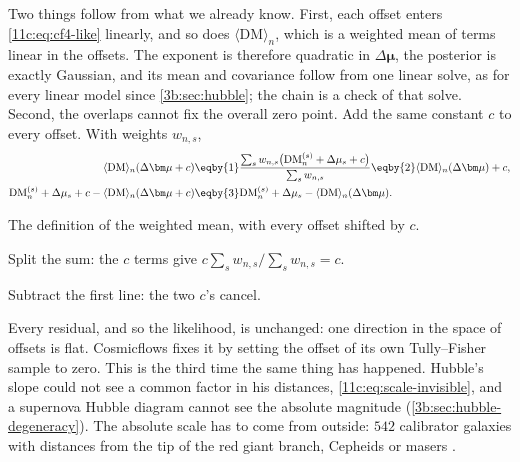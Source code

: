 Two things follow from what we already know. First, each offset enters
\eqref{11c:eq:cf4-like} linearly, and so does $\langle\mathrm{DM}\rangle_n$, which is a
weighted mean of terms linear in the offsets. The exponent is therefore quadratic in
$\Delta\bm\mu$, the posterior is exactly Gaussian, and its mean and covariance follow
from one linear solve, as for every linear model since \cref{3b:sec:hubble}; the
chain is a check of that solve. Second, the overlaps cannot fix the overall zero
point. Add the same constant $c$ to every offset. With weights $w_{n,s}$,
\begin{align}
  \langle\mathrm{DM}\rangle_n(\Delta\bm\mu+c)
  &\eqby{1}\frac{\sum_sw_{n,s}\bigl(\mathrm{DM}^{(s)}_n+\Delta\mu_s+c\bigr)}{\sum_sw_{n,s}}
   \eqby{2}\langle\mathrm{DM}\rangle_n(\Delta\bm\mu)+c,
  \nonumber\\
  \mathrm{DM}^{(s)}_n+\Delta\mu_s+c-\langle\mathrm{DM}\rangle_n(\Delta\bm\mu+c)
  &\eqby{3}\mathrm{DM}^{(s)}_n+\Delta\mu_s-\langle\mathrm{DM}\rangle_n(\Delta\bm\mu).
  \label{11c:eq:cf4-shift}
\end{align}
\begin{explain}
  \item The definition of the weighted mean, with every offset shifted by $c$.
  \item Split the sum: the $c$ terms give $c\sum_sw_{n,s}/\sum_sw_{n,s}=c$.
  \item Subtract the first line: the two $c$'s cancel.
\end{explain}
Every residual, and so the likelihood, is unchanged: one direction in the space of
offsets is flat. Cosmicflows fixes it by setting the offset of its own Tully--Fisher
sample to zero. This is the third time the same thing has happened. Hubble's slope
could not see a common factor in his distances, \eqref{11c:eq:scale-invisible}, and a
supernova Hubble diagram cannot see the absolute magnitude
(\cref{3b:sec:hubble-degeneracy}). The absolute scale has to come from outside:
$542$ calibrator galaxies with distances from the tip of the red giant branch,
Cepheids or masers \cite[Sec.~10]{Tully2023CF4}.

